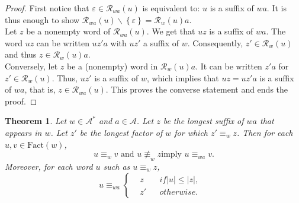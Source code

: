\documentclass[11pt]{report}
\newtheorem{theorem}{Theorem}[chapter]
\begin{document}
\begin{proof}
  First notice that $\varepsilon \in \mathcal{R}_{wa}(u)$ is
  equivalent to: $u$ is a suffix of $wa$. It is thus enough to show
  $\mathcal{R}_{wa}(u)\backslash\left\{\varepsilon\right\}=\mathcal{R}_w(u)a$. \\
  Let $z$ be a nonempty word of $\mathcal{R}_{wa}(u)$. We get that $uz$
  is a suffix of $wa$. The word $uz$ can be written $uz'a$ with $uz'$
  a suffix of $w$. Consequently, $z' \in \mathcal{R}_w(u)$ and thus $z
  \in \mathcal{R}_{w}(u)a$.\\
  Conversely, let $z$ be a (nonempty) word in $\mathcal{R}_w(u)a$. It
  can be written $z'a$ for $z' \in \mathcal{R}_w(u)$. Thus, $uz'$ is a
  suffix of $w$, which implies that $uz = uz'a$ is a suffix of $wa$,
  that is, $z \in \mathcal{R}_{wa}(u)$. This proves the converse
  statement and ends the proof.
\end{proof}
\begin{theorem}
  Let $w \in \mathcal{A}^*$ and $a \in \mathcal{A}$. Let $z$ be the
  longest suffix of $wa$ that appears in $w$. Let $z'$ be the longest
  factor of $w$ for which $z' \equiv_w z$. Then for each $u, v \in
  \text{Fact}(w)$, $$u \equiv_w v \text{ and } u \not\equiv_w z \text{
  imply } u \equiv_{wa} v.$$ Moreover, for each word $u$ such as $u
\equiv_w z$,
\begin{equation*}
  u \equiv_{wa} \left\{
      \begin{aligned}
        &z& &if|u| \le |z|,&\\
        &z'& &otherwise.&
      \end{aligned}
    \right.
\end{equation*}
\end{theorem}
\end{document}
